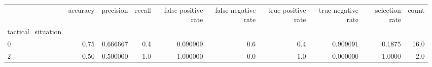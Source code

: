 \begin{tabular}{lrrrrrrrrr}
\toprule
{} &  accuracy &  precision &  recall &  false positive rate &  false negative rate &  true positive rate &  true negative rate &  selection rate &  count \\
tactical\_situation &           &            &         &                      &                      &                     &                     &                 &        \\
\midrule
0                  &      0.75 &   0.666667 &     0.4 &             0.090909 &                  0.6 &                 0.4 &            0.909091 &          0.1875 &   16.0 \\
2                  &      0.50 &   0.500000 &     1.0 &             1.000000 &                  0.0 &                 1.0 &            0.000000 &          1.0000 &    2.0 \\
\bottomrule
\end{tabular}
